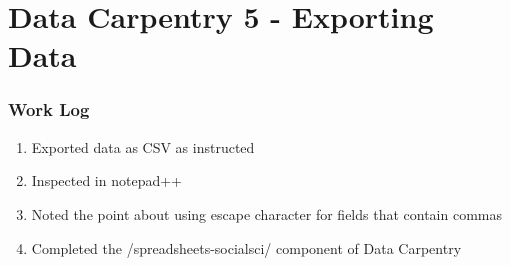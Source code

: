 \documentclass{article}
\begin{document}
\section{Data Carpentry 5 - Exporting Data}
\subsubsection{Work Log}
\begin{enumerate}
    \item Exported data as CSV as instructed
    \item Inspected in notepad++
    \item Noted the point about using escape character for fields that contain commas
    \item Completed the /spreadsheets-socialsci/ component of Data Carpentry
\end{enumerate}
\end{document}
